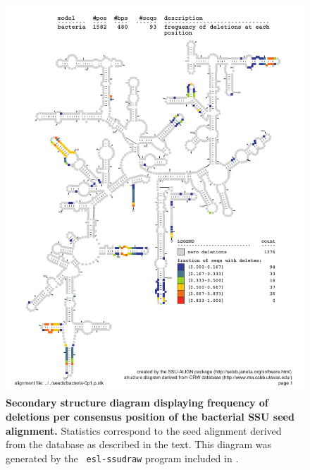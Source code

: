 \begin{figure}
\begin{center}
\includegraphics[width=5.7in]{Figures/bacteria-0p1-dall}
\end{center}
\caption[Secondary structure diagram displaying frequency of deletions
  per consensus position of the bacterial SSU seed
  alignment]{\textbf{Secondary structure diagram displaying frequency 
  of deletions per consensus position of the bacterial SSU seed
  alignment.} Statistics correspond to the  seed
  alignment derived from the  database \cite{CannoneGutell02}
  as described in the text. This diagram was generated by the {\tt
  esl-ssudraw} program included in .}
\label{fig:bacdel}
\end{figure}


